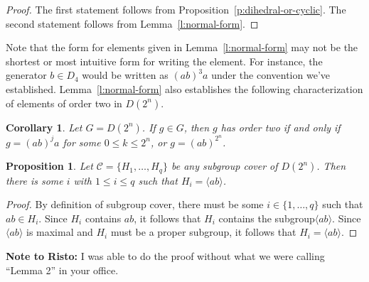\documentclass{amsart}
\numberwithin{equation} {section}
\newtheorem{proposition}[equation]{Proposition}
\newtheorem{corollary}[equation]{Corollary}
\theoremstyle{definition}
\begin{document}
\begin{proof}
The first statement follows from Proposition~\ref{p:dihedral-or-cyclic}. The second statement follows from Lemma~\ref{l:normal-form}. 
\end{proof} 

Note that the form for elements given in Lemma~\ref{l:normal-form} may not be the shortest or most intuitive form for writing the element. For instance, the generator $b \in D_4$ would be written as $(ab)^3a$ under the convention we've established. Lemma~\ref{l:normal-form} also establishes the following characterization of elements of order two in $D(2^n)$. 

\begin{corollary}\label{c:elements-of-order-two}
Let $G = D(2^n)$. If $g \in G$, then $g$ has order two if and only if $g = (ab)^ja$ for some $0 \leq k \leq 2^n$, or $g = (ab)^{2^n}$. 
\end{corollary} 

\begin{proposition}\label{p:subgroup-cover-must-contain-maximal-cyclic}
Let $\mathcal{C} = \{H_1, \ldots, H_q \}$ be any subgroup cover of $D(2^n)$. Then there is some $i$ with $1 \leq i \leq q$ such that $H_i = \langle ab \rangle$.
\end{proposition}

\begin{proof}
By definition of subgroup cover, there must be some $i \in \{1,\ldots, q\}$ such that $ab\in H_i$. Since $H_i$ contains $ab$, it follows that $H_ i$ contains the subgroup$\langle ab \rangle$. Since $\langle ab \rangle$ is maximal and $H_i$ must be a proper subgroup, it follows that $H_i = \langle ab \rangle$. 
\end{proof}

\textbf{Note to Risto:} I was able to do the proof without what we were calling ``Lemma 2'' in your office. 

\begin{comment}
This was originally included as a Lemma, but I no longer feel it is necessary. 

\begin{proposition}\label{p:how-to-cover-reflections}
Le $B = \{(ab)^ja \mid 0 \leq j \leq 2^{n-1} \}$. Let $\mathcal{C}$ be a collection of subgroups of $D(2^n)$. Then $\mathcal{C}$ is a minimal powerful subgroup cover of $B$ if and only if removing the subgroup $\langle ab \rangle$ from $C$ results in a minimal powerful subgroup cover of $D(2^n)$. 
\end{proposition}

\begin{proof}
todo. 
\end{proof}
\end{comment}
\end{document}
